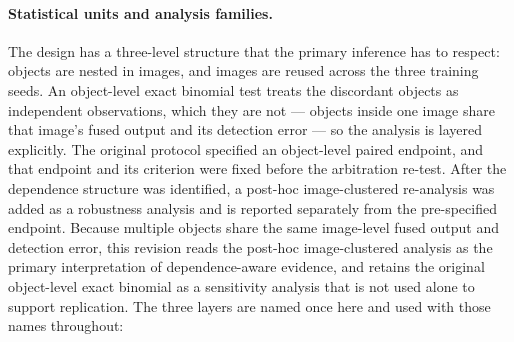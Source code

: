 \documentclass[pdflatex,sn-mathphys-num]{sn-jnl}
\theoremstyle{thmstyleone}%
\theoremstyle{thmstyletwo}%
\theoremstyle{thmstylethree}%
\begin{document}
\paragraph{Statistical units and analysis families.}
The design has a three-level structure that the primary inference has to respect: objects are nested in images, and images are reused across the three training seeds. An object-level exact binomial test treats the discordant objects as independent observations, which they are not --- objects inside one image share that image's fused output and its detection error --- so the analysis is layered explicitly. The original protocol specified an object-level paired endpoint, and that endpoint and its criterion were fixed before the arbitration re-test. After the dependence structure was identified, a post-hoc image-clustered re-analysis was added as a robustness analysis and is reported separately from the pre-specified endpoint. Because multiple objects share the same image-level fused output and detection error, this revision reads the post-hoc image-clustered analysis as the primary interpretation of dependence-aware evidence, and retains the original object-level exact binomial as a sensitivity analysis that is not used alone to support replication. The three layers are named once here and used with those names throughout:
\end{document}
